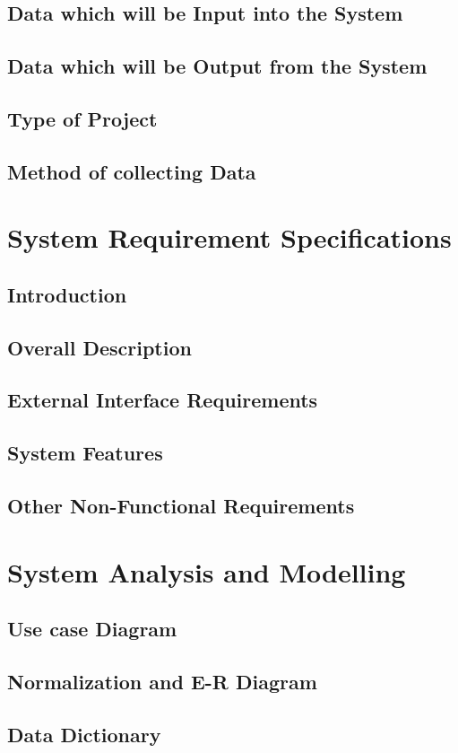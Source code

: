 \documentclass[12pt,a4paper]{report}
\begin{document}
\section{Data which will be Input into the System}
\section{Data which will be Output from the System}
\section{Type of Project}
\section{Method of collecting Data}
\newpage
\chapter{System Requirement Specifications}
\section{Introduction}
\section{Overall Description}
\section{External Interface Requirements}
\section{System Features}
\section{Other Non-Functional Requirements}
\newpage
\chapter{System Analysis and Modelling}
\section{Use case Diagram}
\section{Normalization and E-R Diagram}
\section{Data Dictionary}
\end{document}
